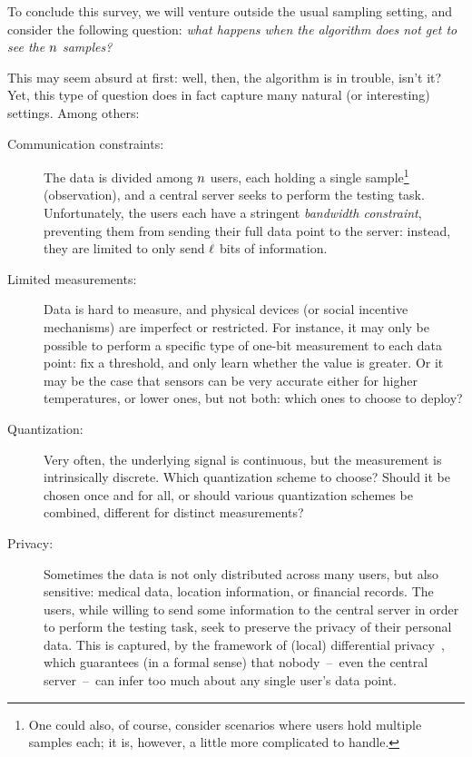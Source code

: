 
To conclude this survey, we will venture outside the usual sampling setting, and consider the following question: \emph{what happens when the algorithm does not get to see the $n$ \iid samples?}

This may seem absurd at first: well, then, the algorithm is in trouble, isn't it? Yet, this type of question does in fact capture many natural (or interesting) settings. Among others:
\begin{description}
	\item[Communication constraints:] The data is divided among $n$ users, each holding a single sample\footnote{One could also, of course, consider scenarios where users hold multiple samples each; it is, however, a little more complicated to handle.} (observation), and a central server seeks to perform the testing task. Unfortunately, the users each have a stringent \emph{bandwidth constraint}, preventing them from sending their full data point to the server: instead, they are limited to only send $\ell$ bits of information.
	\item[Limited measurements:] Data is hard to measure, and physical devices (or social incentive mechanisms) are imperfect or restricted. For instance, it may only be possible to perform a specific type of one-bit measurement to each data point: fix a threshold, and only learn whether the value is greater. Or it may be the case that sensors can be very accurate either for higher temperatures, or lower ones, but not both: which ones to choose to deploy?
	\item[Quantization:] Very often, the underlying signal is continuous, but the measurement is intrinsically discrete. Which quantization scheme to choose? Should it be chosen once and for all, or should various quantization schemes be combined, different for distinct measurements?
	\item[Privacy:] Sometimes the data is not only distributed across many users, but also sensitive: \eg medical data, location information, or financial records. The users, while willing to send some information to the central server in order to perform the testing task, seek to preserve the privacy of their personal data. This is captured, \eg by the framework of (local) differential privacy~\citep{DworkMNS06,KLNRS:11,DJW:13:FOCS}, which guarantees (in a formal sense) that nobody~--~even the central server~--~can infer too much about any single user's data point.

\end{description}
